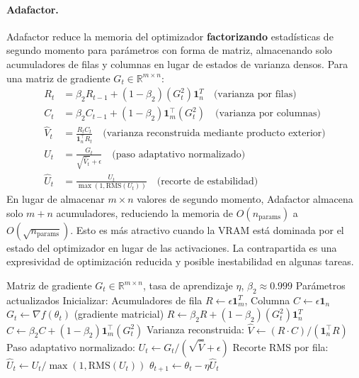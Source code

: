 \documentclass[11pt,a4paper]{article}
\begin{document}
\paragraph{Adafactor.}
Adafactor reduce la memoria del optimizador \textbf{factorizando} estadísticas de segundo momento para parámetros con forma de matriz, almacenando solo acumuladores de filas y columnas en lugar de estados de varianza densos. Para una matriz de gradiente $G_t \in \mathbb{R}^{m \times n}$:
\begin{align}
R_t &= \beta_2 R_{t-1} + (1-\beta_2)(G_t^2) \mathbf{1}_n^T \quad\text{(varianza por filas)} \\
C_t &= \beta_2 C_{t-1} + (1-\beta_2) \mathbf{1}_m^\top (G_t^2) \quad\text{(varianza por columnas)} \\
\hat{V}_t &= \frac{R_t C_t}{\mathbf{1}_n^\top R_t} \quad\text{(varianza reconstruida mediante producto exterior)} \\
U_t &= \frac{G_t}{\sqrt{\hat{V}_t}+\epsilon} \quad\text{(paso adaptativo normalizado)} \\
\hat{U}_t &= \frac{U_t}{\max(1, \text{RMS}(U_t))} \quad\text{(recorte de estabilidad)}
\end{align}
En lugar de almacenar $m \times n$ valores de segundo momento, Adafactor almacena solo $m + n$ acumuladores, reduciendo la memoria de $O(n_{\text{params}})$ a $O(\sqrt{n_{\text{params}}})$. Esto es más atractivo cuando la VRAM está dominada por el estado del optimizador en lugar de las activaciones. La contrapartida es una expresividad de optimización reducida y posible inestabilidad en algunas tareas.

\begin{algorithm}[H]
\caption{Adafactor (Estadísticas de Segundo Momento Factorizadas)}
\label{alg:adafactor}
\begin{algorithmic}[1]
\Require Matriz de gradiente $G_t \in \mathbb{R}^{m \times n}$, tasa de aprendizaje $\eta$, $\beta_2 \approx 0.999$
\Ensure Parámetros actualizados
\State Inicializar: Acumuladores de fila $R \gets \epsilon \mathbf{1}^T_m$, Columna $C \gets \epsilon \mathbf{1}_n$
    \State $G_t \gets \nabla f(\theta_t)$ (gradiente matricial)
    \State $R \gets \beta_2 R + (1-\beta_2) (G_t^2) \mathbf{1}_n^T$ 
    \State $C \gets \beta_2 C + (1-\beta_2) \mathbf{1}_m^\top (G_t^2)$ 
    \State Varianza reconstruida: $\hat{V} \gets (R \cdot C) / (\mathbf{1}_n^\top R)$ 
    \State Paso adaptativo normalizado: $U_t \gets G_t / (\sqrt{\hat{V}} + \epsilon)$
    \State Recorte RMS por fila: $\hat{U}_t \gets U_t / \max(1, \text{RMS}(U_t))$
    \State $\theta_{t+1} \gets \theta_t - \eta \hat{U}_t$
\EndFor
\end{algorithmic}
\end{algorithm}
\end{document}
